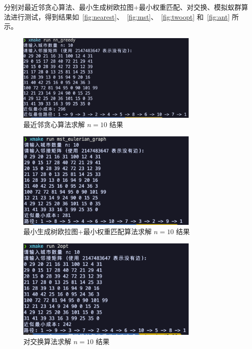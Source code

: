 分别对最近邻贪心算法、最小生成树欧拉图+最小权重匹配、对交换、模拟蚁群算法进行测试，得到结果如~\autoref{fig:nearest}、~\autoref{fig:mst}、~\autoref{fig:twoopt} 和~\autoref{fig:ant} 所示。
\begin{figure}[htbp]
    \centering
    \includegraphics[width=0.8\textwidth]{images/greedy_10.png}
    \caption{最近邻贪心算法求解 $n=10$ 结果}
    \label{fig:nearest}
\end{figure}
\begin{figure}[htbp]
    \centering
    \includegraphics[width=0.8\textwidth]{images/mst_10.png}
    \caption{最小生成树欧拉图+最小权重匹配算法求解 $n=10$ 结果}
    \label{fig:mst}
\end{figure}
\begin{figure}[htbp]
    \centering
    \includegraphics[width=0.8\textwidth]{images/2opt_10.png}
    \caption{对交换算法求解 $n=10$ 结果}
    \label{fig:twoopt}
\end{figure}
